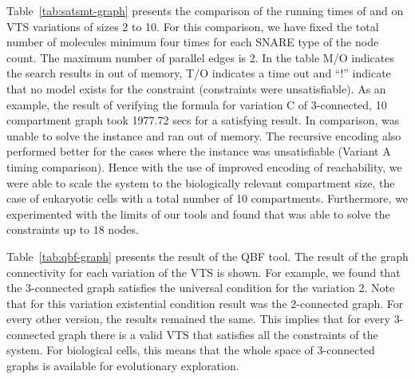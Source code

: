 

%
Table~\ref{tab:satsmt-graph} presents the comparison of the running times of {\smttool} and {\sattool} on VTS variations of sizes 2 to 10.
%
For this comparison, we have fixed the total number of molecules minimum four times for each SNARE type of the node count. 
%
The maximum number of parallel edges is 2.
%
%
%
In the table M/O indicates the search results in out of memory, T/O indicates a time out and ``!'' indicate that no model exists for the constraint  (constraints were unsatisfiable).
%
As an example, the result of verifying the formula for variation C of 3-connected, 10 compartment graph took 1977.72 secs for a satisfying result.
%
In comparison, {\sattool} was unable to solve the instance and ran out of memory.
%
The recursive encoding also performed better for the cases where the instance was unsatisfiable (Variant A timing comparison).
%
Hence with the use of improved encoding of reachability, we were able to scale the system to the biologically relevant compartment size, the case of eukaryotic cells with a total number of 10 compartments.
%
Furthermore, we experimented with the limits of our tools and found that {\smttool} was able to solve the constraints up to $18$ nodes.



Table~\ref{tab:qbf-graph} presents the result of the QBF tool.
%
The result of the graph connectivity for each variation of the VTS is shown.  
%
For example, we found that the 3-connected graph satisfies the universal condition for the variation 2. 
%
Note that for this variation existential condition result was the 2-connected graph. 
%
For every other version, the results remained the same.
%
This implies that for every 3-connected graph there is a valid VTS that satisfies all the constraints of the system.
% 
For biological cells, this means that the whole space of 3-connected graphs is available for evolutionary exploration.
%


